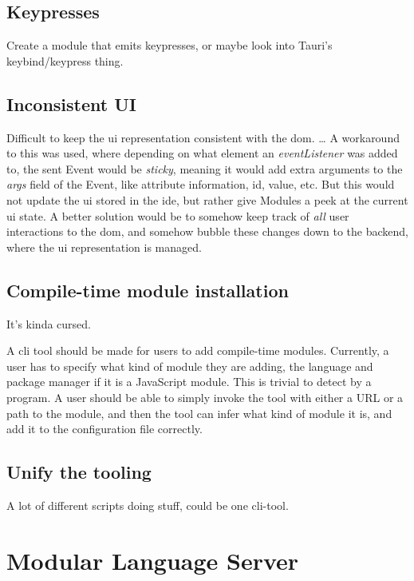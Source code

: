 \subsection{Keypresses}

Create a module that emits keypresses, or maybe look into Tauri's
keybind/keypress thing.

\subsection{Inconsistent UI}

Difficult to keep the \gls*{ui} representation consistent with the \gls*{dom}.
\dots
A workaround to this was used, where depending on what element an
\textit{eventListener} was added to, the sent Event would be \textit{sticky},
meaning it would add extra arguments to the \textit{args} field of the Event,
like attribute information, id, value, etc. But this would not update the
\gls*{ui} stored in the \gls*{ide}, but rather give Modules a peek at the current
\gls*{ui} state. A better solution would be to somehow keep track of \textit{all}
user interactions to the \gls*{dom}, and somehow bubble these changes down to the
backend, where the \gls*{ui} representation is managed.

\subsection{Compile-time module installation}

It's kinda cursed.

A \gls{cli} tool should be made for users to add compile-time modules.
Currently, a user has to specify what kind of module they are adding, the
language and package manager if it is a JavaScript module. This is trivial to
detect by a program. A user should be able to simply invoke the tool with
either a URL or a path to the module, and then the tool can infer what kind of
module it is, and add it to the configuration file correctly.

\subsection{Unify the tooling}

A lot of different scripts doing stuff, could be one \gls*{cli}-tool.

\section{Modular Language Server}

